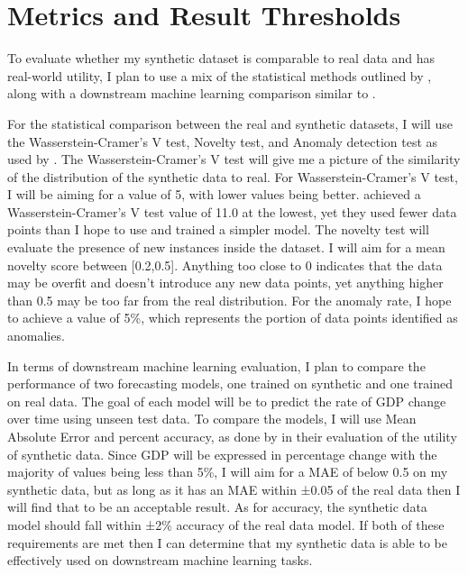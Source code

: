 \documentclass[10pt,twocolumn]{article}
\begin{document}
\section{Metrics and Result Thresholds}
To evaluate whether my synthetic dataset is comparable to real data and has real-world utility, I plan to use a mix of the statistical methods outlined by \textcite{livieris2024anevaluationframework}, along with a downstream machine learning comparison similar to \textcite{yuan2024multifacetedevaluation}.

For the statistical comparison between the real and synthetic datasets, I will use the Wasserstein-Cramer’s V test, Novelty test, and Anomaly detection test as used by \textcite{livieris2024anevaluationframework}. The Wasserstein-Cramer’s V test will give me a picture of the similarity of the distribution of the synthetic data to real. For Wasserstein-Cramer’s V test, I will be aiming for a value of 5, with lower values being better. \textcite{livieris2024anevaluationframework} achieved a Wasserstein-Cramer’s V test value of 11.0 at the lowest, yet they used fewer data points than I hope to use and trained a simpler model. The novelty test will evaluate the presence of new instances inside the dataset. I will aim for a mean novelty score between [0.2,0.5]. Anything too close to 0 indicates that the data may be overfit and doesn’t introduce any new data points, yet anything higher than 0.5 may be too far from the real distribution. For the anomaly rate, I hope to achieve a value of  5\%, which represents the portion of data points identified as anomalies.

In terms of downstream machine learning evaluation, I plan to compare the performance of two forecasting models, one trained on synthetic and one trained on real data. The goal of each model will be to predict the rate of GDP change over time using unseen test data. To compare the models, I will use Mean Absolute Error and percent accuracy, as done by \textcite{yuan2024multifacetedevaluation} in their evaluation of the utility of synthetic data. Since GDP will be expressed in percentage change with the majority of values being less than 5\%, I will aim for a MAE of below 0.5 on my synthetic data, but as long as it has an MAE within ±0.05 of the real data then I will find that to be an acceptable result. As for accuracy, the synthetic data model should fall within ±2\% accuracy of the real data model. If both of these requirements are met then I can determine that my synthetic data is able to be effectively used on downstream machine learning tasks.
\end{document}
